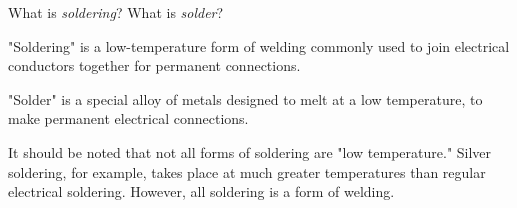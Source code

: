 

What is {\it soldering}?  What is {\it solder}?







"Soldering" is a low-temperature form of welding commonly used to join electrical conductors together for permanent connections.

"Solder" is a special alloy of metals designed to melt at a low temperature, to make permanent electrical connections.







It should be noted that not all forms of soldering are "low temperature."  Silver soldering, for example, takes place at much greater temperatures than regular electrical soldering.  However, all soldering is a form of welding.




